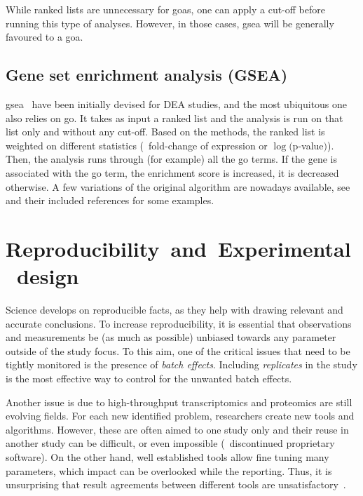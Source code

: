 While ranked lists are unnecessary for \glspl{goa},
one can apply a cut-off before running this type of analyses.
However, in those cases,
\gls{gsea} will be generally favoured to a \gls{goa}.

\subsection{Gene set enrichment analysis (GSEA)}

\gls{gsea}~ have been initially devised for \gls{DEA}
studies, and the most ubiquitous one also relies on \gls{go}.
It takes as input a ranked list and the analysis is run on that list only
and without any cut-off.
Based on the methods, the ranked list is weighted on different statistics (\eg\
fold-change of expression or $\log($p-value$)$).
Then, the analysis runs through (for example) all the \gls{go} terms.
If the gene is associated with the \gls{go} term,
the enrichment score is increased,
it is decreased otherwise.
A few variations of the original algorithm are nowadays available,
see \citet{Tamayo2012-qw,Irizarry2009-sc}
and their included references for some examples.


\section{Reproducibility~and~Experimental~design}\label{sec:expDesign}

Science develops on reproducible facts,
as they help with drawing relevant and accurate conclusions.
To increase reproducibility,
it is essential that observations and measurements
be (as much as possible) unbiased
towards any parameter outside of the study focus.
To this aim, one of the critical issues that need to be tightly monitored
is the presence of \emph{batch effects}.
Including \emph{replicates} in the study is the most effective way to control
for the unwanted batch effects.

Another issue is due to high-throughput transcriptomics and proteomics
are still evolving fields.
For each new identified problem,
researchers create new tools and algorithms.
However, these are often aimed to one study only
and their reuse in another study can be difficult,
or even impossible (\eg\ discontinued proprietary software).
On the other hand, well established tools allow fine tuning many parameters,
which impact can be overlooked while the reporting.
Thus, it is unsurprising that result agreements between different tools
are unsatisfactory~\mycite{reviewRNAseqBestpractice}.

